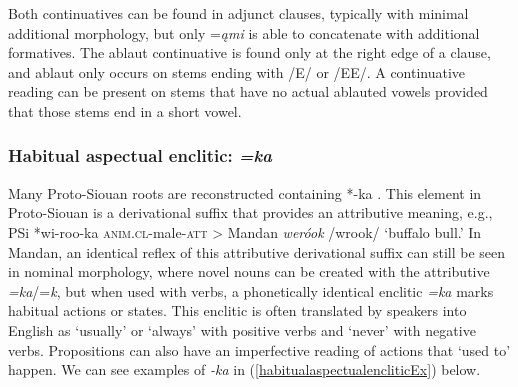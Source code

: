 \label{ParaContinuativeSummary} Both continuatives can be found in adjunct clauses, typically with minimal additional morphology, but only =\textit{ąmi} is able to concatenate with additional formatives. The ablaut continuative is found only at the right edge of a clause, and ablaut only occurs on stems ending with /E/ or /EE/. A continuative reading can be present on stems that have no actual ablauted vowels provided that those stems end in a short vowel.

\subsubsection{Habitual aspectual enclitic: \textit{=ka}}\label{habitualaspectualenclitic}

Many Proto-Siouan roots are reconstructed containing *-ka \citep{rankin2015}. This element in Proto-Siouan is a derivational suffix that provides an attributive meaning, e.g., PSi *wi-roo-ka \textsc{anim.cl}-male-\textsc{att} > Mandan \textit{weróok} /wrook/ `buffalo bull.' In Mandan, an identical reflex of this attributive derivational suffix can still be seen in nominal morphology, where novel nouns can be created with the attributive \textit{=ka}/=\textit{k}, but when used with verbs, a phonetically identical enclitic \textit{=ka} marks habitual actions or states. This enclitic is often translated by speakers into English as `usually' or `always' with positive verbs and `never' with negative verbs. Propositions can also have an imperfective reading of actions that `used to' happen. We can see examples of \textit{-ka} in (\ref{habitualaspectualencliticEx}) below.



